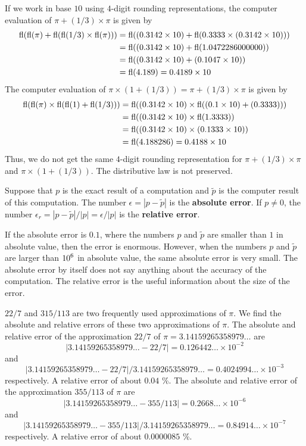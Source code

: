\begin{itemize}
If we work in base $10$ using $4$-digit rounding representations, the
computer evaluation of $\pi + (1/3) \times \pi$ is given by
\begin{align*}
\operatorname{fl}(\operatorname{fl}(\pi)+\operatorname{fl}(\operatorname{fl}(1/3) \times \operatorname{fl}(\pi)))
&= \operatorname{fl}( (0.3142\times 10) + \operatorname{fl}( 0.3333 \times (0.3142 \times 10) )) \\
&= \operatorname{fl}( (0.3142\times 10) + \operatorname{fl}( 1.0472286000000  )) \\
&= \operatorname{fl}( (0.3142\times 10) + (0.1047 \times 10) ) \\
&= \operatorname{fl}( 4.189 ) = 0.4189 \times 10
\end{align*}
The computer evaluation of
$\pi \times (1 + (1/3))= \pi + (1/3)\times \pi$ is given by 
\begin{align*}
\operatorname{fl}( \operatorname{fl}(\pi) \times \operatorname{fl}( \operatorname{fl}(1) + \operatorname{fl}(1/3)))
&= \operatorname{fl}( (0.3142\times 10) \times \operatorname{fl}( (0.1\times 10) + (0.3333) )) \\
&= \operatorname{fl}( (0.3142\times 10) \times \operatorname{fl}(1.3333) ) \\
&= \operatorname{fl}( (0.3142\times 10) \times (0.1333\times 10) ) \\
&= \operatorname{fl}( 4.188286 ) = 0.4188 \times 10
\end{align*}
Thus, we do not get the same $4$-digit rounding representation for
$\pi + (1/3)\times \pi$ and $\pi \times (1 + (1/3))$.  The
distributive law is not preserved.
\end{itemize}

Suppose that $p$ is the exact result of a computation and $\tilde{p}$
is the computer result of this computation.  The number
$\epsilon = |p-\tilde{p}|$ is the
{\bfseries absolute error}.
If $p\neq 0$, the number
$\epsilon_r= |p-\tilde{p}|/|p|= \epsilon/|p|$
is the {\bfseries relative error}.

If the absolute error is $0.1$, where the numbers $p$ and $\tilde{p}$
are smaller than $1$ in absolute value, then the error is enormous.
However, when the numbers $p$ and $\tilde{p}$ are larger than
$\displaystyle 10^6$
in absolute value, the same absolute error is very small.  The
absolute error by itself does not say anything about the accuracy of
the computation.  The relative error is the useful information about
the size of the error.

\begin{egg}
$22/7$ and $315/113$ are two frequently used approximations of $\pi$.
We find the absolute and relative errors of these two approximations
of $\pi$.  The absolute and relative error of the approximation $22/7$ of
$\pi = 3.14159265358979\ldots$ are
\[
|3.14159265358979\ldots- 22/7| = 0.126442\ldots \times 10^{-2}
\]
and
\[
|3.14159265358979\ldots
- 22/7|/3.14159265358979\ldots = 0.4024994\ldots\times 10^{-3}
\]
respectively.  A relative error of about $0.04$ \%.  The absolute and
relative error of the approximation $355/113$ of $\pi$ are
\[
|3.14159265358979\ldots- 355/113| =
0.2668\ldots\times 10^{-6}
\]
and
\[
|3.14159265358979\ldots - 355/113|/3.14159265358979\ldots
= 0.84914\ldots\times10^{-7}
\]
respectively.  A relative error of about $0.0000085$ \%.
\end{egg}

